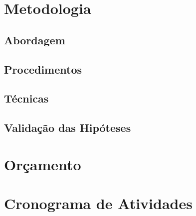 \section{Metodologia} \label{sec:Methodology}

\subsection{Abordagem}

\subsection{Procedimentos}

\subsection{Técnicas}

\subsection{Validação das Hipóteses}


\section{Orçamento} \label{sec:budget}


\section{Cronograma de Atividades} \label{sec:schedule_activities_table}

